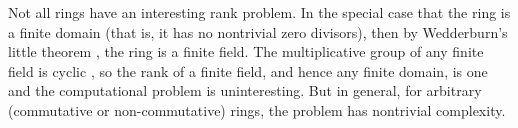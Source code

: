Not all rings have an interesting rank problem.
In the special case that the ring is a finite domain (that is, it has no nontrivial zero divisors), then by Wedderburn's little theorem \autocite[Theorem~3~§~11.1]{nicholson12}, the ring is a finite field.
The multiplicative group of any finite field is cyclic \autocite[Theorem~7~§~6.4]{nicholson12}, so the rank of a finite field, and hence any finite domain, is one and the computational problem is uninteresting.
But in general, for arbitrary (commutative or non-commutative) rings, the problem has nontrivial complexity.




